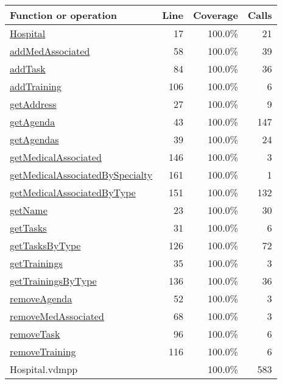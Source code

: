 \begin{longtable}{|l|r|r|r|}
\hline
Function or operation & Line & Coverage & Calls \\
\hline
\hline
\hyperref[Hospital:17]{Hospital} & 17&100.0\% & 21 \\
\hline
\hyperref[addMedAssociated:58]{addMedAssociated} & 58&100.0\% & 39 \\
\hline
\hyperref[addTask:84]{addTask} & 84&100.0\% & 36 \\
\hline
\hyperref[addTraining:106]{addTraining} & 106&100.0\% & 6 \\
\hline
\hyperref[getAddress:27]{getAddress} & 27&100.0\% & 9 \\
\hline
\hyperref[getAgenda:43]{getAgenda} & 43&100.0\% & 147 \\
\hline
\hyperref[getAgendas:39]{getAgendas} & 39&100.0\% & 24 \\
\hline
\hyperref[getMedicalAssociated:146]{getMedicalAssociated} & 146&100.0\% & 3 \\
\hline
\hyperref[getMedicalAssociatedBySpecialty:161]{getMedicalAssociatedBySpecialty} & 161&100.0\% & 1 \\
\hline
\hyperref[getMedicalAssociatedByType:151]{getMedicalAssociatedByType} & 151&100.0\% & 132 \\
\hline
\hyperref[getName:23]{getName} & 23&100.0\% & 30 \\
\hline
\hyperref[getTasks:31]{getTasks} & 31&100.0\% & 6 \\
\hline
\hyperref[getTasksByType:126]{getTasksByType} & 126&100.0\% & 72 \\
\hline
\hyperref[getTrainings:35]{getTrainings} & 35&100.0\% & 3 \\
\hline
\hyperref[getTrainingsByType:136]{getTrainingsByType} & 136&100.0\% & 36 \\
\hline
\hyperref[removeAgenda:52]{removeAgenda} & 52&100.0\% & 3 \\
\hline
\hyperref[removeMedAssociated:68]{removeMedAssociated} & 68&100.0\% & 3 \\
\hline
\hyperref[removeTask:96]{removeTask} & 96&100.0\% & 6 \\
\hline
\hyperref[removeTraining:116]{removeTraining} & 116&100.0\% & 6 \\
\hline
\hline
Hospital.vdmpp & & 100.0\% & 583 \\
\hline
\end{longtable}

